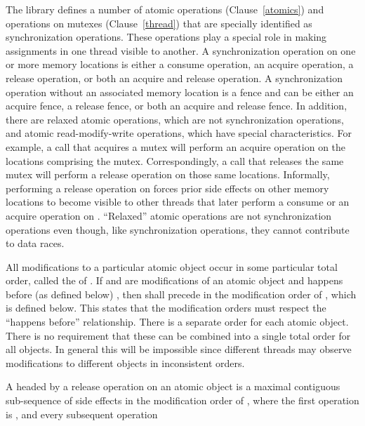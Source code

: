 \pnum
The library defines a number of atomic operations (Clause~\ref{atomics}) and
operations on mutexes (Clause~\ref{thread}) that are specially identified as
synchronization operations. These operations play a special role in making
assignments in one thread visible to another. A synchronization operation on one
or more memory locations is either a consume operation, an acquire operation, a
release operation, or both an acquire and release operation. A synchronization
operation without an associated memory location is a fence and can be either an
acquire fence, a release fence, or both an acquire and release fence. In
addition, there are relaxed atomic operations, which are not synchronization
operations, and atomic read-modify-write operations, which have special
characteristics. \enternote For example, a call that acquires a mutex will
perform an acquire operation on the locations comprising the mutex.
Correspondingly, a call that releases the same mutex will perform a release
operation on those same locations. Informally, performing a release operation on
 forces prior
%
side effects on other memory locations to become visible
to other threads that later perform a consume or an acquire operation on
. ``Relaxed'' atomic operations are not synchronization operations even
though, like synchronization operations, they cannot contribute to data races.
\exitnote

\pnum
All modifications to a particular atomic object  occur in some
particular total order, called the  of . If
 and  are modifications of an atomic object  and
 happens before (as defined below) , then  shall precede
 in the modification order of , which is defined below.
\enternote This states that the modification orders must respect the ``happens
before'' relationship. \exitnote \enternote There is a separate order for each
atomic object. There is no requirement that these can be combined into a single
total order for all objects. In general this will be impossible since different
threads may observe modifications to different objects in inconsistent orders.
\exitnote

\pnum
A  headed by a release operation  on an atomic object
 is a maximal contiguous sub-sequence of
%
side effects in the
modification order of , where the first operation is , and
every subsequent operation

